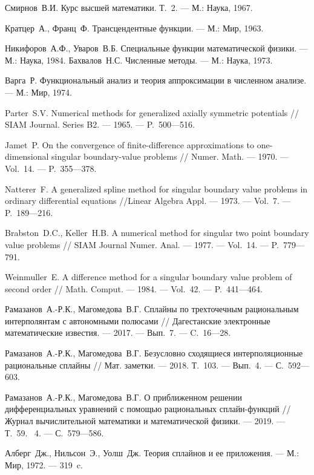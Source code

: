 \begin{thebibliography}{111}

 Смирнов~В.И. Курс высшей математики. Т.~2.
--- М.: Наука, 1967. 

 Кратцер~А., Франц~Ф. Трансцендентные функции.
 --- М.: Мир, 1963.

 Никифоров~А.Ф., Уваров~В.Б. Специальные функции математической физики.
 --- М.: Наука, 1984.
  Бахвалов~Н.С. Численные методы.
--- М.: Наука, 1973. 

  Варга~Р. Функциональный анализ и теория аппроксимации
в численном анализе. --- М.: Мир, 1974. 

 Parter~S.V. Numerical methods for generalized axially symmetric potentials
 // SIAM Journal. Series B2.  --- 1965.  --- P.~500---516.

  Jamet~P. On the convergence of finite-difference 
approximations to one-dimensional singular boundary-value problems
 // Numer. Math.  --- 1970. --- Vol.~14. --- P.~355---378.

  Natterer~F. A generalized spline method for singular boundary value problems in ordinary differential equations
 //Linear Algebra Appl. --- 1973. --- Vol.~7. --- P.~189---216.

 Brabston~D.C., Keller~H.B. A numerical method for singular
 two point  boundary value problems
 // SIAM Journal Numer. Anal. --- 1977. --- Vol.~14. --- P.~779---791.

  Weinmuller~E. A difference  method for a singular
 boundary value problem of second order
 // Math. Comput. --- 1984. --- Vol.~42. --- P.~441---464. 
 
 Рамазанов~А.-Р.К., Магомедова~В.Г. Сплайны по трехточечным 
рациональным интерполянтам с автономными полюсами // Дагестанские электронные
 математические известия. --- 2017. --- Вып.~7. --- C.~16---28.

 Рамазанов~А.-Р.К., Магомедова~В.Г. Безусловно сходящиеся интерполяционные рациональные сплайны // Мат. заметки. --- 2018. Т.~103. --- Вып.~4. --- С.~592---603.

 Рамазанов~А.-Р.К., Магомедова~В.Г. О приближенном решении дифференциальных 
уравнений с помощью рациональных сплайн-функций // Журнал вычислительной математики и математической физики. --- 2019. --- Т.~59. \No~4. --- С.~579---586.

  Алберг~Дж., Нильсон~Э., Уолш~Дж. Теория сплайнов и ее приложения. --- М.: Мир, 1972. --- 319~c.


\end{thebibliography}
